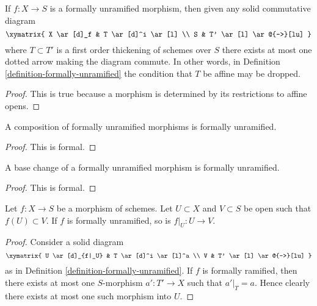 \begin{lemma}
\label{lemma-formally-unramified-not-affine}
If $f : X \to S$ is a formally unramified morphism, then given
any solid commutative diagram
$$
\xymatrix{
X \ar[d]_f & T \ar[d]^i \ar[l] \\
S & T' \ar[l] \ar@{-->}[lu]
}
$$
where $T \subset T'$ is a first order thickening of schemes over $S$
there exists at most one dotted arrow making the diagram commute.
In other words, in
Definition \ref{definition-formally-unramified}
the condition that $T$ be affine may be dropped.
\end{lemma}

\begin{proof}
This is true because a morphism is determined by its restrictions
to affine opens.
\end{proof}

\begin{lemma}
\label{lemma-composition-formally-unramified}
A composition of formally unramified morphisms is formally unramified.
\end{lemma}

\begin{proof}
This is formal.
\end{proof}

\begin{lemma}
\label{lemma-base-change-formally-unramified}
A base change of a formally unramified morphism is formally unramified.
\end{lemma}

\begin{proof}
This is formal.
\end{proof}

\begin{lemma}
\label{lemma-formally-unramified-on-opens}
Let $f : X \to S$ be a morphism of schemes.
Let $U \subset X$ and $V \subset S$ be open such that
$f(U) \subset V$. If $f$ is formally unramified, so is $f|_U : U \to V$.
\end{lemma}

\begin{proof}
Consider a solid diagram
$$
\xymatrix{
U \ar[d]_{f|_U} & T \ar[d]^i \ar[l]^a \\
V & T' \ar[l] \ar@{-->}[lu]
}
$$
as in Definition \ref{definition-formally-unramified}. If $f$ is formally
ramified, then there exists at most one
$S$-morphism $a' : T' \to X$ such that $a'|_T = a$.
Hence clearly there exists at most one such morphism into $U$.
\end{proof}

